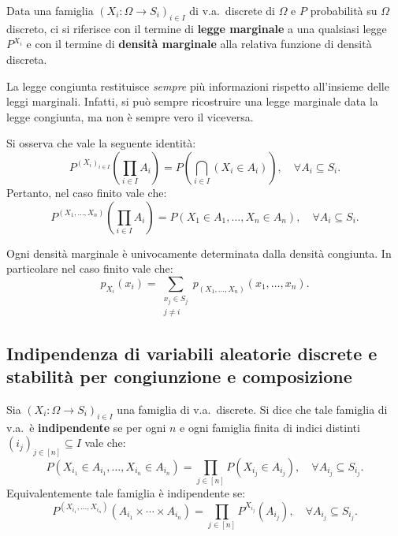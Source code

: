 \begin{multicols*}{2}
\begin{definition}
    Data una famiglia $(X_i : \Omega \to S_i)_{i \in I}$ di
    v.a.~discrete di $\Omega$ e $P$ probabilità su $\Omega$ discreto,
    ci si riferisce con il termine di \textbf{legge marginale} a una qualsiasi
    legge $P^{X_i}$ e con il termine di \textbf{densità marginale} alla relativa
    funzione di densità discreta.
\end{definition}

\begin{remark}
    La legge congiunta restituisce \textit{sempre} più informazioni rispetto
    all'insieme delle leggi marginali. Infatti, si può sempre ricostruire una
    legge marginale data la legge congiunta, ma non è sempre vero il
    viceversa. \medskip
\end{remark}

\begin{remark}
    Si osserva che vale la seguente identità:
    \[
        P^{(X_i)_{i \in I}}\left(\prod_{i \in I} A_i\right) = P\left(\bigcap_{i \in I} (X_i \in A_i)\right), \quad \forall A_i \subseteq S_i.
    \]
    Pertanto, nel caso finito vale che:
    \[
        P^{(X_1, \ldots, X_n)}\left(\prod_{i \in I} A_i\right) = P\left(X_1 \in A_1, \ldots, X_n \in A_n\right), \quad \forall A_i \subseteq S_i.
    \]
\end{remark}

\begin{proposition}
    Ogni densità marginale è univocamente determinata dalla densità
    congiunta. In particolare nel caso finito vale che:
    \[
        p_{X_i}(x_i) = \sum_{\substack{x_j \in S_j \\ j \neq i}} p_{(X_1, \ldots, X_n)}(x_1, \ldots, x_n).
    \]
\end{proposition}

\subsection{Indipendenza di variabili aleatorie discrete e stabilità per congiunzione e composizione}

\begin{definition}
    Sia $(X_i : \Omega \to S_i)_{i \in I}$ una famiglia di v.a.~discrete. Si dice che tale famiglia di v.a.~è \textbf{indipendente} se per ogni $n$ e ogni famiglia finita di
    indici distinti $(i_j)_{j \in [n]} \subseteq I$ vale che:
    \[
        P(X_{i_1} \in A_{i_1}, \ldots, X_{i_n} \in A_{i_n}) = \prod_{j \in [n]} P(X_{i_j} \in A_{i_j}), \quad \forall A_{i_j} \subseteq S_{i_j}.
    \]
    Equivalentemente tale famiglia è indipendente se:
    \[
        P^{(X_{i_1}, \ldots, X_{i_n})}(A_{i_1} \times \cdots \times A_{i_n}) = \prod_{j \in [n]} P^{X_{i_j}}(A_{i_j}), \quad \forall A_{i_j} \subseteq S_{i_j}.
    \]
\end{definition}


\end{multicols*}
